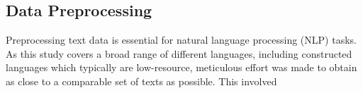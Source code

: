 \documentclass[12pt,a4paper]{article}
\numberwithin{figure}{section}
\numberwithin{table}{section}
\numberwithin{definition}{section}
\begin{document}

\subsection{Data Preprocessing}
\label{ssec:datapreprocessing}

Preprocessing text data is essential for natural language processing (NLP) tasks. As this study covers a broad range of different languages, including constructed languages which typically are low-resource, meticulous effort was made to obtain as close to a comparable set of texts as possible. This involved 

\end{document}
